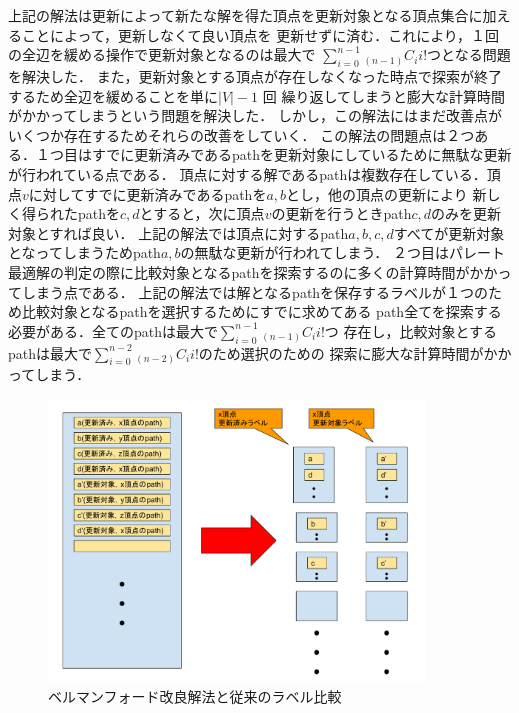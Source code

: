 \documentclass[12pt]{optlab-bachelor}
\begin{document}
%
%


上記の解法は更新によって新たな解を得た頂点を更新対象となる頂点集合に加えることによって，更新しなくて良い頂点を
更新せずに済む．これにより，１回の全辺を緩める操作で更新対象となるのは最大で
$\displaystyle \sum_{i=0}^{n-1} {}_{(n-1)}C_i i!$つとなる問題を解決した．
また，更新対象とする頂点が存在しなくなった時点で探索が終了するため全辺を緩めることを単に$|V|-1$ 回
繰り返してしまうと膨大な計算時間がかかってしまうという問題を解決した．
しかし，この解法にはまだ改善点がいくつか存在するためそれらの改善をしていく．
この解法の問題点は２つある．１つ目はすでに更新済みであるpathを更新対象にしているために無駄な更新が行われている点である．
頂点に対する解であるpathは複数存在している．頂点$v$に対してすでに更新済みであるpathを$a,b$とし，他の頂点の更新により
新しく得られたpathを$c,d$とすると，次に頂点$v$の更新を行うときpath$c,d$のみを更新対象とすれば良い．
上記の解法では頂点に対するpath$a,b,c,d$すべてが更新対象となってしまうためpath$a,b$の無駄な更新が行われてしまう．
２つ目はパレート最適解の判定の際に比較対象となるpathを探索するのに多くの計算時間がかかってしまう点である．
上記の解法では解となるpathを保存するラベルが１つのため比較対象となるpathを選択するためにすでに求めてある
path全てを探索する必要がある．全てのpathは最大で$\displaystyle \sum_{i=0}^{n-1} {}_{(n-1)}C_i i!$つ
存在し，比較対象とするpathは最大で$\displaystyle \sum_{i=0}^{n-2} {}_{(n-2)}C_i i!$のため選択のための
探索に膨大な計算時間がかかってしまう．

\begin{figure}[htbp]
  \centering
  \caption{ベルマンフォード改良解法と従来のラベル比較}
  \includegraphics[width=10.0cm]{fig/fig3.pdf}
\end{figure}
\end{document}
